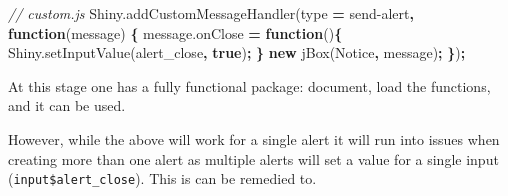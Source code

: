 \documentclass[
]{krantz}
\makeatletter
\newenvironment{Shaded}{\begin{snugshade}}{\end{snugshade}}
\newcommand{\AttributeTok}[1]{\textcolor[rgb]{0.61,0.61,0.61}{#1}}
\newcommand{\CommentTok}[1]{\textcolor[rgb]{0.37,0.37,0.37}{\textit{#1}}}
\newcommand{\ControlFlowTok}[1]{\textcolor[rgb]{0.27,0.27,0.27}{\textbf{#1}}}
\newcommand{\KeywordTok}[1]{\textcolor[rgb]{0.27,0.27,0.27}{\textbf{#1}}}
\newcommand{\NormalTok}[1]{#1}
\newcommand{\OperatorTok}[1]{\textcolor[rgb]{0.43,0.43,0.43}{\textbf{#1}}}
\newcommand{\StringTok}[1]{\textcolor[rgb]{0.5,0.5,0.5}{#1}}
\newcommand{\VariableTok}[1]{\textcolor[rgb]{0,0,0}{#1}}
\newenvironment{kframe}{%
\medskip{}
\setlength{\fboxsep}{.8em}
 \def\at@end@of@kframe{}%
 \ifinner\ifhmode%
  \def\at@end@of@kframe{\end{minipage}}%
  \begin{minipage}{\columnwidth}%
 \fi\fi%
 \def\FrameCommand##1{\hskip\@totalleftmargin \hskip-\fboxsep
 \colorbox{shadecolor}{##1}\hskip-\fboxsep
     \hskip-\linewidth \hskip-\@totalleftmargin \hskip\columnwidth}%
 \MakeFramed {\advance\hsize-\width
   \@totalleftmargin\z@ \linewidth\hsize
   \@setminipage}}%
 {\par\unskip\endMakeFramed%
 \at@end@of@kframe}
\renewenvironment{Shaded}{\begin{kframe}}{\end{kframe}}
\makeatother
\begin{document}
\begin{Shaded}
\begin{Highlighting}[]
\CommentTok{// custom.js}
\VariableTok{Shiny}\NormalTok{.}\AttributeTok{addCustomMessageHandler}\NormalTok{(type }\OperatorTok{=} \StringTok{\textquotesingle{}send{-}alert\textquotesingle{}}\OperatorTok{,} \KeywordTok{function}\NormalTok{(message) }\OperatorTok{\{}
  \VariableTok{message}\NormalTok{.}\AttributeTok{onClose} \OperatorTok{=} \KeywordTok{function}\NormalTok{()}\OperatorTok{\{}
    \VariableTok{Shiny}\NormalTok{.}\AttributeTok{setInputValue}\NormalTok{(}\StringTok{\textquotesingle{}alert\_close\textquotesingle{}}\OperatorTok{,} \KeywordTok{true}\NormalTok{)}\OperatorTok{;}
  \OperatorTok{\}}
  \KeywordTok{new} \AttributeTok{jBox}\NormalTok{(}\StringTok{\textquotesingle{}Notice\textquotesingle{}}\OperatorTok{,}\NormalTok{ message)}\OperatorTok{;}
\OperatorTok{\}}\NormalTok{)}\OperatorTok{;}
\end{Highlighting}
\end{Shaded}

At this stage one has a fully functional package: document, load the functions, and it can be used.

\begin{Shaded}
\end{Shaded}

However, while the above will work for a single alert it will run into issues when creating more than one alert as multiple alerts will set a value for a single input (\texttt{input\$alert\_close}). This is can be remedied to.
\end{document}
